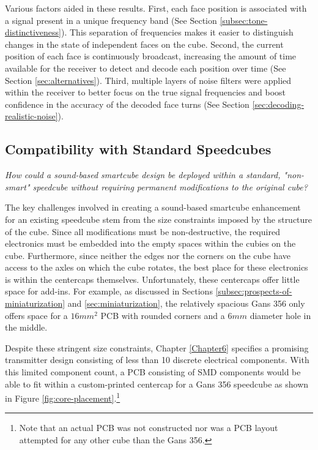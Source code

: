 Various factors aided in these results. First, each face position is
associated with a signal present in a unique frequency band (See
Section \ref{subsec:tone-distinctiveness}). This separation of
frequencies makes it easier to distinguish changes in the state of
independent faces on the cube. Second, the current position of each
face is continuously broadcast, increasing the amount of time available
for the receiver to detect and decode each position over time (See
Section \ref{sec:alternatives}). Third, multiple layers of noise
filters were applied within the receiver to better focus on the true
signal frequencies and boost confidence in the accuracy of the decoded
face turns (See Section \ref{sec:decoding-realistic-noise}).


\subsection{Compatibility with Standard Speedcubes}
\label{subsec:answer-compatibility}

\emph{How could a sound-based smartcube design be deployed within a
standard, "non-smart" speedcube without requiring permanent
modifications to the original cube?}

The key challenges involved in creating a sound-based smartcube
enhancement for an existing speedcube stem from the size constraints
imposed by the structure of the cube. Since all modifications must be
non-destructive, the required electronics must be embedded into the
empty spaces within the cubies on the cube. Furthermore, since neither
the edges nor the corners on the cube have access to the axles on which
the cube rotates, the best place for these electronics is within the
centercaps themselves. Unfortunately, these centercaps offer little
space for add-ins. For example, as discussed in Sections
\ref{subsec:prospects-of-miniaturization} and
\ref{sec:miniaturization}, the relatively spacious Gans 356 only offers
space for a $16mm^2$ PCB with rounded corners and a $6mm$ diameter hole
in the middle.

Despite these stringent size constraints, Chapter \ref{Chapter6}
specifies a promising transmitter design consisting of less than 10
discrete electrical components. With this limited component count, a
PCB consisting of SMD components would be able to fit within a
custom-printed centercap for a Gans 356 speedcube as shown in Figure
\ref{fig:core-placement}.\footnote{Note that an actual PCB was not
constructed nor was a PCB layout attempted for any other cube than the
Gans 356.}

